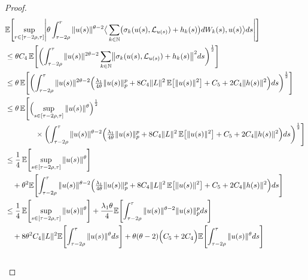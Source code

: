 \documentclass[11pt]{article}
\numberwithin{equation}{section}
\theoremstyle{plain}
\begin{document}
\begin{proof}
 \begin{align}
 	& \mathbb{E}\Biggl[
 	\sup_{r \in [\tau - 2\rho,\tau]}
 	\Biggl| \theta \int_{\tau - 2\rho}^{r} \|u(s)\|^{\theta-2}
 	\big\langle
 	\sum_{k \in \mathbb{N}}
 	\bigl( \sigma_k(u(s),\mathcal{L}_{u(s)}) + h_k(s) \bigr) dW_k(s),
 	u(s)
 	\big\rangle
 	ds \Biggr|
 	\Biggr]
 	\nonumber \\
 	&\le
 	\theta C_4 \,
 	\mathbb{E}\Biggl[
 	\biggl(
 	\int_{\tau - 2\rho}^{\tau}
 	\|u(s)\|^{2\theta-2}
 	\sum_{k \in \mathbb{N}}
 	\bigl\|\sigma_k(u(s),\mathcal{L}_{u(s)}) + h_k(s)\bigr\|^{2}
 	ds
 	\biggr)^{\frac12}
 	\Biggr]
 	\nonumber \\
 	&\le
 	\theta \,
 	\mathbb{E}\Biggl[
 	\biggl(
 	\int_{\tau - 2\rho}^{\tau}
 	\|u(s)\|^{2\theta-2}
 	\Bigl(
 	\tfrac{\lambda_1}{4\theta} \|u(s)\|_{p}^{p}
 	+ 8C_4 \|L\|^{2}\,\mathbb{E}\bigl[\|u(s)\|^{2}\bigr]
 	+ C_5
 	 + 2C_4 \|h(s)\|^{2}
 	\Bigr)
 	ds
 	\biggr)^{\frac12}
 	\Biggr]
 	\nonumber \\
 	&\le
 	\theta \,
 	\mathbb{E}\Biggl[
 	\Bigl(
 	\sup_{s \in [\tau- 2\rho,\tau]}
 	\|u(s)\|^{\theta}
 	\Bigr)^{\frac12}
 	\nonumber \\
 	& \qquad \qquad  \times
 	\biggl(
 	\int_{\tau - 2\rho}^{\tau}
 	\|u(s)\|^{\theta-2}
 	\Bigl(
 	\tfrac{\lambda_1}{4 \theta} \|u(s)\|_{p}^{p}
 	+ 8C_4 \|L\|^{2}\,\mathbb{E}\bigl[\|u(s)\|^{2}\bigr]
 	+ C_5 
 	+ 2C_4 \|h(s)\|^{2}
 	\Bigr)
 	ds
 	\biggr)^{\frac12}
 	\Biggr]
 	\nonumber \\
 	&\le
 	\frac{1}{4} \,
 	\mathbb{E}\Biggl[
 	\sup_{s \in [\tau - 2\rho,\tau]}
 	\|u(s)\|^{\theta}
 	\Biggr]
 	\nonumber \\
 	&\quad
 	+{\theta}^2
 	\mathbb{E}\Biggl[
 	\int_{\tau - 2\rho}^{\tau}
 	\|u(s)\|^{\theta-2}
 	\Bigl(
 	\tfrac{\lambda_1}{4 \theta} \|u(s)\|_{p}^{p}
 	+ 8C_4 \|L\|^{2}\,\mathbb{E}\bigl[\|u(s)\|^{2}\bigr]
 	+ C_5
 	+ 2C_4 \|h(s)\|^{2}
 	\Bigr)
 	ds
 	\Biggr]
 	\nonumber \\
 	&\le
 	\frac{1}{4} \,
 	\mathbb{E}\Biggl[
 	\sup_{s \in [\tau - 2\rho,\tau]}
 	\|u(s)\|^{\theta}
 	\Biggr]
 	+
 	\frac{\lambda_1 \theta}{4 }
 	\mathbb{E}\Biggl[
 	\int_{\tau - 2\rho}^{\tau}
 	\|u(s)\|^{\theta-2} \|u(s)\|_{p}^{p} ds
 	\Biggr]
 	\nonumber \\
 	&\quad
 	+ 8\theta^2 C_4 \|L\|^{2}
 	\mathbb{E}\Biggl[
 	\int_{\tau - 2\rho}^{\tau}
 	\|u(s)\|^{\theta} ds
 	\Biggr]
 	+ \theta  (\theta-2)
 	\Bigl(
 	C_5 + 2C_4
 	\Bigr)
 	\mathbb{E}\Biggl[
 	\int_{\tau - 2\rho}^{\tau}
 	\|u(s)\|^{\theta} ds
 	\Biggr]
 	\nonumber \\
 	&\quad

\end{align}
\end{proof}
\end{document}
